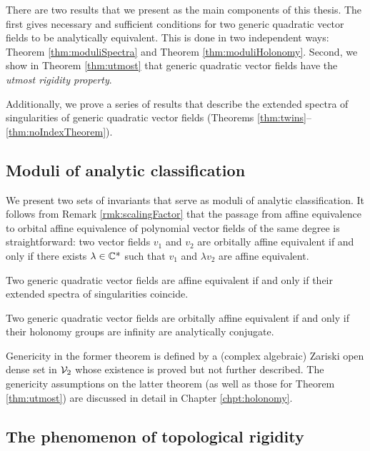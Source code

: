 \documentclass[phd,tocprelim]{cornell}
\begin{document}
There are two results that we present as the main components of this thesis. The first gives necessary and sufficient conditions for two generic quadratic vector fields to be analytically equivalent. This is done in two independent ways: Theorem \ref{thm:moduliSpectra} and Theorem \ref{thm:moduliHolonomy}. Second, we show in Theorem \ref{thm:utmost} that generic quadratic vector fields have the \textit{utmost rigidity property}.

Additionally, we prove a series of results that describe the extended spectra of singularities of generic quadratic vector fields (Theorems \ref{thm:twins}--\ref{thm:noIndexTheorem}).


\subsection{Moduli of analytic classification}

We present two sets of invariants that serve as moduli of analytic classification. It follows from Remark \ref{rmk:scalingFactor} that the passage from affine equivalence to orbital affine equivalence of polynomial vector fields of the same degree is straightforward: two vector fields $v_1$ and $v_2$ are orbitally affine equivalent if and only if there exists $\lambda\in\mathbb{C}\mbox{*}$ such that $v_1$ and $\lambda v_2$ are affine equivalent.

\begin{theorem}\label{thm:moduliSpectra}
 Two generic quadratic vector fields are affine equivalent if and only if their extended spectra of singularities coincide.
\end{theorem}

\begin{theorem}\label{thm:moduliHolonomy}
 Two generic quadratic vector fields are orbitally affine equivalent if and only if their holonomy groups are infinity are analytically conjugate.
\end{theorem}


Genericity in the former theorem is defined by a (complex algebraic) Zariski open dense set in $\mathcal{V}_2$ whose existence is proved but not further described. The genericity assumptions on the latter theorem (as well as those for Theorem \ref{thm:utmost}) are discussed in detail in Chapter \ref{chpt:holonomy}.


\subsection{The phenomenon of topological rigidity}\label{subsec:rigidity}
\end{document}

